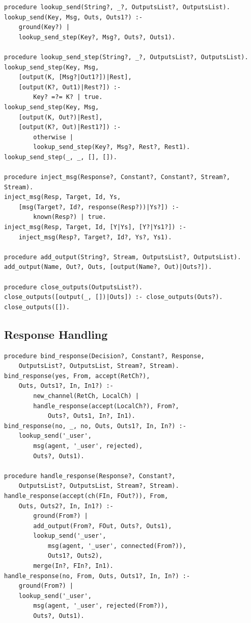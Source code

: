 \begin{verbatim}
procedure lookup_send(String?, _?, OutputsList?, OutputsList).
lookup_send(Key, Msg, Outs, Outs1?) :-
    ground(Key?) |
    lookup_send_step(Key?, Msg?, Outs?, Outs1).

procedure lookup_send_step(String?, _?, OutputsList?, OutputsList).
lookup_send_step(Key, Msg,
    [output(K, [Msg?|Out1?])|Rest],
    [output(K?, Out1)|Rest?]) :-
        Key? =?= K? | true.
lookup_send_step(Key, Msg,
    [output(K, Out?)|Rest],
    [output(K?, Out)|Rest1?]) :-
        otherwise |
        lookup_send_step(Key?, Msg?, Rest?, Rest1).
lookup_send_step(_, _, [], []).

procedure inject_msg(Response?, Constant?, Constant?, Stream?, Stream).
inject_msg(Resp, Target, Id, Ys,
    [msg(Target?, Id?, response(Resp?))|Ys?]) :-
        known(Resp?) | true.
inject_msg(Resp, Target, Id, [Y|Ys], [Y?|Ys1?]) :-
    inject_msg(Resp?, Target?, Id?, Ys?, Ys1).

procedure add_output(String?, Stream, OutputsList?, OutputsList).
add_output(Name, Out?, Outs, [output(Name?, Out)|Outs?]).

procedure close_outputs(OutputsList?).
close_outputs([output(_, [])|Outs]) :- close_outputs(Outs?).
close_outputs([]).
\end{verbatim}

\subsection{Response Handling}
\label{app:response-handling}

\begin{verbatim}
procedure bind_response(Decision?, Constant?, Response,
    OutputsList?, OutputsList, Stream?, Stream).
bind_response(yes, From, accept(RetCh?),
    Outs, Outs1?, In, In1?) :-
        new_channel(RetCh, LocalCh) |
        handle_response(accept(LocalCh?), From?,
            Outs?, Outs1, In?, In1).
bind_response(no, _, no, Outs, Outs1?, In, In?) :-
    lookup_send('_user',
        msg(agent, '_user', rejected),
        Outs?, Outs1).

procedure handle_response(Response?, Constant?,
    OutputsList?, OutputsList, Stream?, Stream).
handle_response(accept(ch(FIn, FOut?)), From,
    Outs, Outs2?, In, In1?) :-
        ground(From?) |
        add_output(From?, FOut, Outs?, Outs1),
        lookup_send('_user',
            msg(agent, '_user', connected(From?)),
            Outs1?, Outs2),
        merge(In?, FIn?, In1).
handle_response(no, From, Outs, Outs1?, In, In?) :-
    ground(From?) |
    lookup_send('_user',
        msg(agent, '_user', rejected(From?)),
        Outs?, Outs1).
\end{verbatim}

